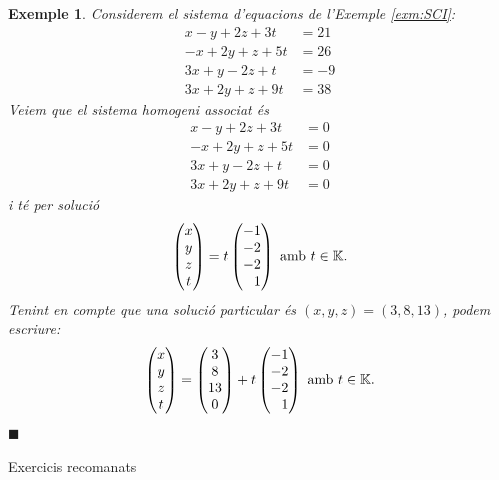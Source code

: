 \documentclass[
  11pt,
]{book}
\makeatletter
\numberwithin{dummy}{section}
\theoremstyle{maincolornumbox}
\theoremstyle{blacknumex}
\newtheorem{exampleT}{Exemple}[chapter]
\theoremstyle{blacknumbox}
\theoremstyle{maincolornum}
\newenvironment{example}{\begin{exampleT}}{\hfill{\tiny\ensuremath{\blacksquare}}\end{exampleT}}
\renewcommand{\section}{\@startsection{section}{1}{\z@}
{-4ex \@plus -1ex \@minus -.4ex}
{1ex \@plus.2ex }
{\normalfont\large\sffamily\bfseries}}
\makeatother
\begin{document}
\begin{example}
Considerem el sistema d'equacions de l'Exemple
\ref{exm:SCI}:
\begin{align*}
    x - y + 2z + 3t &= 21 \\
    -x+2y+z+5t&=26\\
    3x+y-2z+t&=-9\\
    3x+2y+z+9t&=38
\end{align*} Veiem que el sistema homogeni associat és
\begin{align*}
    x - y + 2z + 3t &= 0\\
    -x+2y+z+5t&=0\\
    3x+y-2z+t&=0\\
    3x+2y+z+9t&=0
\end{align*} i té per solució \[\begin{pmatrix}
    x \\ y \\ z \\ t
    \end{pmatrix} =
    t \begin{pmatrix}
    -1 \\ -2 \\ -2 \\ \phantom{-}1
    \end{pmatrix} \text{ amb $t\in\mathbb{K}$.}\] Tenint en compte que una solució
particular és \((x,y,z)=(3,8,13)\), podem escriure: \[\begin{pmatrix}
    x \\ y \\ z \\ t
    \end{pmatrix} =
    \begin{pmatrix}
    3 \\ 8 \\ 13 \\ 0
    \end{pmatrix}+
    t \begin{pmatrix}
    -1 \\ -2 \\ -2 \\ \phantom{-}1
    \end{pmatrix} \text{ amb $t\in\mathbb{K}$.}\]
\end{example}

\section{Exercicis recomanats}\label{exercicis-recomanats}
\end{document}
